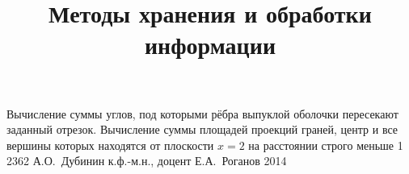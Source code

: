 \documentclass[a4paper,12pt]{memoir}
\begin{document}
\renewcommand{\contentsname}{{\Large{Содержание}\hfill}}

\title{Методы хранения и обработки информации}
{Вычисление суммы углов, под которыми рёбра выпуклой оболочки пересекают заданный отрезок.
Вычисление суммы площадей проекций граней, центр и все вершины которых находятся от плоскости $\mathit x = 2$ на расстоянии строго меньше 1}
{2362}
{А.\+О.~Дубинин}
{к.ф.-м.н., доцент}
{Е.\+А.~Роганов}
{2014}





\newpage
\end{document}
